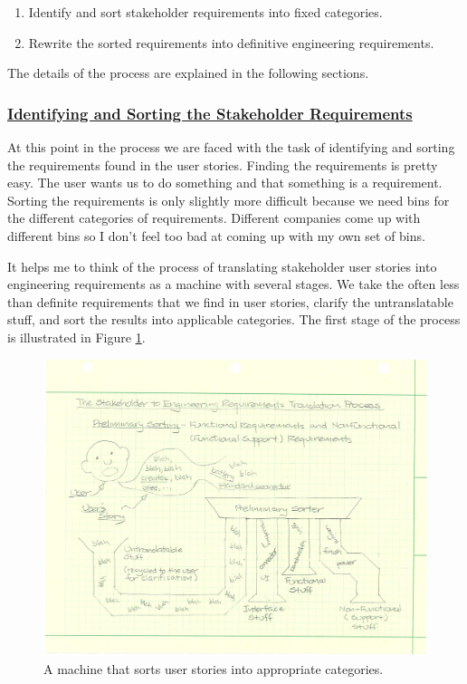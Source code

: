 \begin{slshape}
\begin{enumerate}
\item Identify and sort stakeholder requirements into fixed categories.
\item Rewrite the sorted requirements into definitive engineering requirements.
\end{enumerate}

The details of the process are explained in the following sections.

\subsubsection*{\underline{Identifying and Sorting the Stakeholder Requirements}}

At this point in the process we are faced with the task of identifying and sorting the requirements found in the user stories.  Finding the requirements is pretty easy.  The user wants us to do something and that something is a requirement.  Sorting the requirements is only slightly more difficult because we need bins for the different categories of requirements.  Different companies come up with different bins so I don't feel too bad at coming up with my own set of bins.
\bigskip



It helps me to think of the process of translating stakeholder user stories into engineering requirements as a machine with several stages.  We take the often less than definite requirements that we find in user stories, clarify the untranslatable stuff, and sort the results into applicable categories.  The first stage of the process is illustrated in Figure \ref{fig:PreliminarySorting}.
\bigskip

\begin{figure}[tb]
\centering
\includegraphics[angle=0,width=15cm]{PreliminarySorting.pdf}
\caption{\label{fig:PreliminarySorting} A machine that sorts user stories into appropriate categories.}
\end{figure}




\end{slshape}
